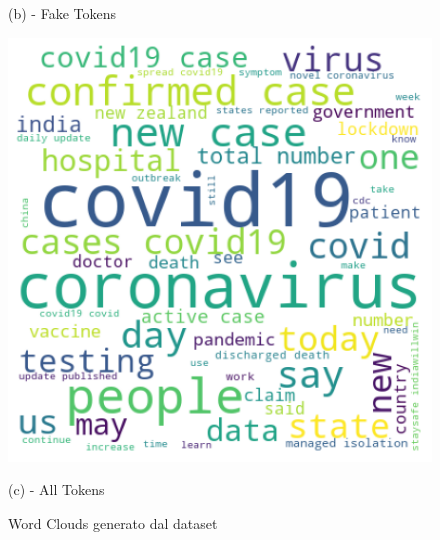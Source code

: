 \documentclass{article}
\begin{document}
\begin{figure}[H]
  \caption*{(b) - Fake Tokens}\label{fig:fake_tokens}
\endminipage\hfill
{}%
  \includegraphics[width=\linewidth]{all_tokens.png}
  \caption*{(c) - All Tokens}\label{fig:all_tokens.png}
\endminipage
\caption{Word Clouds generato dal dataset}
\end{figure}







\newpage
\end{document}
